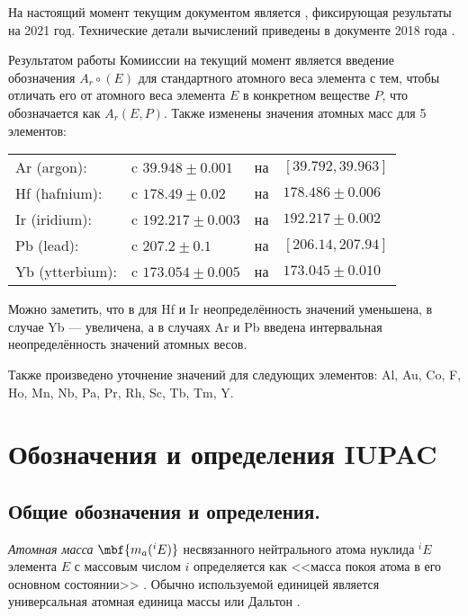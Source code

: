 \documentclass[a5paper,openany]{book}
\begin{document}
На настоящий момент текущим документом является \cite{IUPAC2021}, фиксирующая результаты на 2021 год. Технические детали вычислений приведены в документе 2018 года \cite{IUPACUncertainty}.

Результатом работы Комииссии на текущий момент является введение обозначения $A_{r}{\circ}(E)$ для стандартного атомного веса элемента с тем, чтобы отличать его от атомного веса элемента $E$ в конкретном  веществе  $P$, что обозначается как $A_r(E, P)$.  
Также изменены значения атомных масс для 5 элементов:
\begin{tabular}{llcl}
Ar (argon): & c $39.948 \pm 0.001$ & на & $[ 39.792, 39.963 ]$ \\
Hf (hafnium): & c $178.49 \pm 0.02$ & на & $178.486 \pm 0.006$ \\
Ir (iridium): & c $192.217 \pm 0.003$ & на & $192.217 \pm 0.002$ \\
Pb (lead): & c $207.2 \pm 0.1$ & на & $[ 206.14, 207.94 ]$ \\
Yb (ytterbium): & c $173.054 \pm 0.005$ & на & $173.045 \pm 0.010$
\end{tabular}

Можно заметить, что в для Hf и Ir неопределённость значений уменьшена, в случае Yb --- увеличена, а в случаях Ar и Pb введена интервальная неопределённость значений атомных весов.

Также произведено уточнение значений для следующих элементов: Al, Au,
Co, F, Ho, Mn, Nb, Pa, Pr, Rh, Sc, Tb, Tm, Y.

\section{Обозначения и определения IUPAC}




\subsection{Общие обозначения и определения.}


\emph{Атомная масса} $\mbf{m_a(^iE)}$ несвязанного нейтрального атома нуклида $^iE$ элемента $E$ с массовым числом $i$  определяется как <<масса покоя атома в его основном состоянии>> \cite{IUPACGoldBook}. Обычно используемой единицей является универсальная атомная единица массы  или Дальтон \cite{IUPACGoldBook}.  
\end{document}
